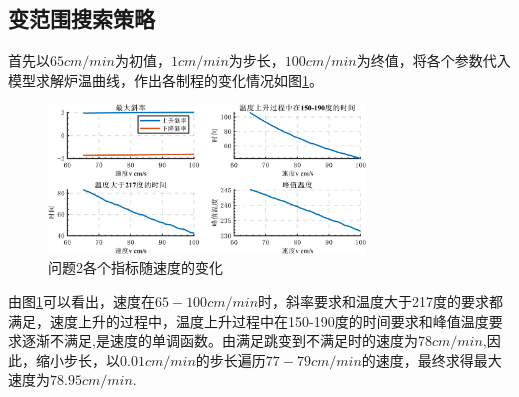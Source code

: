 \documentclass[withoutpreface,bwprint]{cumcmthesis} %
\begin{document}
\subsection{变范围搜索策略}
首先以$65cm/min$为初值，$1cm/min$为步长，$100cm/min$为终值，将各个参数代入模型求解炉温曲线，作出各制程的变化情况如图\ref{问题2各个指标随速度的变化}。
	\begin{figure}[H]
	\centering
	\includegraphics[width=0.75\textwidth]{问题2各个指标随速度的变化}
	\caption{问题2各个指标随速度的变化}
	\label{问题2各个指标随速度的变化}
\end{figure}
由图\ref{问题2各个指标随速度的变化}可以看出，速度在$65-100cm/min$时，斜率要求和温度大于217度的要求都满足，速度上升的过程中，温度上升过程中在150-190度的时间要求和峰值温度要求逐渐不满足,是速度的单调函数。由满足跳变到不满足时的速度为$78cm/min$,因此，缩小步长，以$0.01cm/min$的步长遍历$77-79cm/min$的速度，最终求得最大速度为$78.95cm/min$.
	
\end{document}
